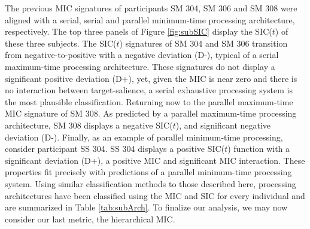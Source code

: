 
The previous MIC signatures of participants SM 304, SM 306 and SM 308 were aligned with a serial, serial and parallel minimum-time processing architecture, respectively. The top three panels of Figure \ref{fig:subSIC} display the SIC($t$) of these three subjects. The SIC($t$) signatures of SM 304 and SM 306 transition from negative-to-positive with a negative deviation (D-), typical of a serial maximum-time processing architecture. These signatures do not display a significant positive deviation (D+), yet, given the MIC is near zero and there is no interaction between target-salience, a serial exhaustive processing system is the most plausible classification. Returning now to the parallel maximum-time MIC signature of SM 308. As predicted by a parallel maximum-time processing architecture, SM 308 displays a negative SIC($t$), and significant negative deviation (D-). Finally, as an example of parallel minimum-time processing, consider participant SS 304. SS 304 displays a positive SIC($t$) function with a significant deviation (D+), a positive MIC and significant MIC interaction. These properties fit precisely with predictions of a parallel minimum-time processing system. Using similar classification methods to those described here, processing architectures have been classified using the MIC and SIC for every individual and are summarized in Table \ref{tab:subArch}. To finalize our analysis, we may now consider our last metric, the hierarchical MIC.


